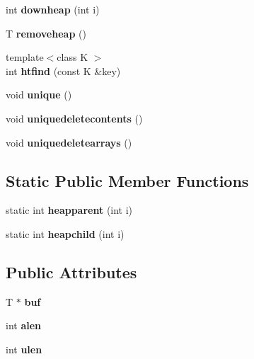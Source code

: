 \begin{DoxyCompactItemize}
\item 
\mbox{\label{structvector_afd018336bccb491ad569e12c9ec6092b}} 
int {\bfseries downheap} (int i)
\item 
\mbox{\label{structvector_aae7414b428036a6a109e2a40976e0eb1}} 
T {\bfseries removeheap} ()
\item 
\mbox{\label{structvector_aeb422be9160e47b6960ac83078e725bc}} 
{\footnotesize template$<$class K $>$ }\\int {\bfseries htfind} (const K \&key)
\item 
\mbox{\label{structvector_adf718ba43138d1e28f8e914fca4fd332}} 
void {\bfseries unique} ()
\item 
\mbox{\label{structvector_a9ce497c56e52a9e9ef5593928692eae0}} 
void {\bfseries uniquedeletecontents} ()
\item 
\mbox{\label{structvector_a55ec5680fd3731aaf7364b86e3e21f5a}} 
void {\bfseries uniquedeletearrays} ()
\end{DoxyCompactItemize}
\subsection*{Static Public Member Functions}
\begin{DoxyCompactItemize}
\item 
\mbox{\label{structvector_ad5053033279ea5d16860228c1fb460b3}} 
static int {\bfseries heapparent} (int i)
\item 
\mbox{\label{structvector_a960f7ccf713e2e29475b4534607573a5}} 
static int {\bfseries heapchild} (int i)
\end{DoxyCompactItemize}
\subsection*{Public Attributes}
\begin{DoxyCompactItemize}
\item 
\mbox{\label{structvector_a2bb835cb1456a5a1700906a49fe72483}} 
T $\ast$ {\bfseries buf}
\item 
\mbox{\label{structvector_a7bf3e117a2c8618edc5dc0ef7c06e455}} 
int {\bfseries alen}
\item 
\mbox{\label{structvector_add07f68356671ba0bf6537267fde2946}} 
int {\bfseries ulen}
\end{DoxyCompactItemize}
